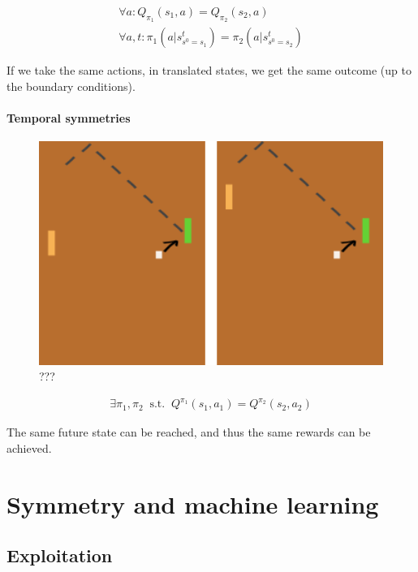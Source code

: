\begin{align*}
\forall a: Q_{\pi_1}(s_1, a) = Q_{\pi_2}(s_2, a) \\
\forall a, t: \pi_1(a|s^t_{s^0=s_1}) = \pi_2(a|s^t_{s^0=s_2})
\end{align*}

If we take the same actions, in translated states, we get the same
outcome (up to the boundary conditions).

\hypertarget{temporal-symmetries}{%
\paragraph{Temporal symmetries}\label{temporal-symmetries}}

\begin{figure}
\centering
\includegraphics[width=1\textwidth,height=0.25\textheight]{../../pictures/drawings/pong-reach.png}
\caption{???}
\end{figure}

\begin{align*}
\exists \pi_1, \pi_2 \;\;\text{s.t.} \;\; Q^{\pi_1}(s_1, a_1) = Q^{\pi_2}(s_2, a_2)
\end{align*}

The same future state can be reached, and thus the same rewards can be
achieved.


\section{Symmetry and machine learning}

\subsection{Exploitation} \label{symmetric-exploitation}

